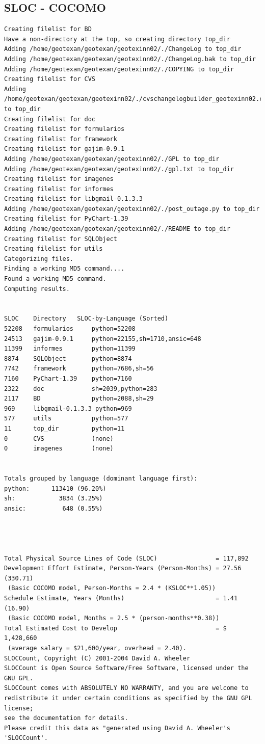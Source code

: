 \documentclass[a4paper]{article}
\begin{document}
        \subsection{SLOC - COCOMO}
        \begin{verbatim}
Creating filelist for BD
Have a non-directory at the top, so creating directory top_dir
Adding /home/geotexan/geotexan/geotexinn02/./ChangeLog to top_dir
Adding /home/geotexan/geotexan/geotexinn02/./ChangeLog.bak to top_dir
Adding /home/geotexan/geotexan/geotexinn02/./COPYING to top_dir
Creating filelist for CVS
Adding /home/geotexan/geotexan/geotexinn02/./cvschangelogbuilder_geotexinn02.cache to top_dir
Creating filelist for doc
Creating filelist for formularios
Creating filelist for framework
Creating filelist for gajim-0.9.1
Adding /home/geotexan/geotexan/geotexinn02/./GPL to top_dir
Adding /home/geotexan/geotexan/geotexinn02/./gpl.txt to top_dir
Creating filelist for imagenes
Creating filelist for informes
Creating filelist for libgmail-0.1.3.3
Adding /home/geotexan/geotexan/geotexinn02/./post_outage.py to top_dir
Creating filelist for PyChart-1.39
Adding /home/geotexan/geotexan/geotexinn02/./README to top_dir
Creating filelist for SQLObject
Creating filelist for utils
Categorizing files.
Finding a working MD5 command....
Found a working MD5 command.
Computing results.


SLOC	Directory	SLOC-by-Language (Sorted)
52208   formularios     python=52208
24513   gajim-0.9.1     python=22155,sh=1710,ansic=648
11399   informes        python=11399
8874    SQLObject       python=8874
7742    framework       python=7686,sh=56
7160    PyChart-1.39    python=7160
2322    doc             sh=2039,python=283
2117    BD              python=2088,sh=29
969     libgmail-0.1.3.3 python=969
577     utils           python=577
11      top_dir         python=11
0       CVS             (none)
0       imagenes        (none)


Totals grouped by language (dominant language first):
python:      113410 (96.20%)
sh:            3834 (3.25%)
ansic:          648 (0.55%)




Total Physical Source Lines of Code (SLOC)                = 117,892
Development Effort Estimate, Person-Years (Person-Months) = 27.56 (330.71)
 (Basic COCOMO model, Person-Months = 2.4 * (KSLOC**1.05))
Schedule Estimate, Years (Months)                         = 1.41 (16.90)
 (Basic COCOMO model, Months = 2.5 * (person-months**0.38))
Total Estimated Cost to Develop                           = $ 1,428,660
 (average salary = $21,600/year, overhead = 2.40).
SLOCCount, Copyright (C) 2001-2004 David A. Wheeler
SLOCCount is Open Source Software/Free Software, licensed under the GNU GPL.
SLOCCount comes with ABSOLUTELY NO WARRANTY, and you are welcome to
redistribute it under certain conditions as specified by the GNU GPL license;
see the documentation for details.
Please credit this data as "generated using David A. Wheeler's 'SLOCCount'.
        \end{verbatim}
\end{document}
